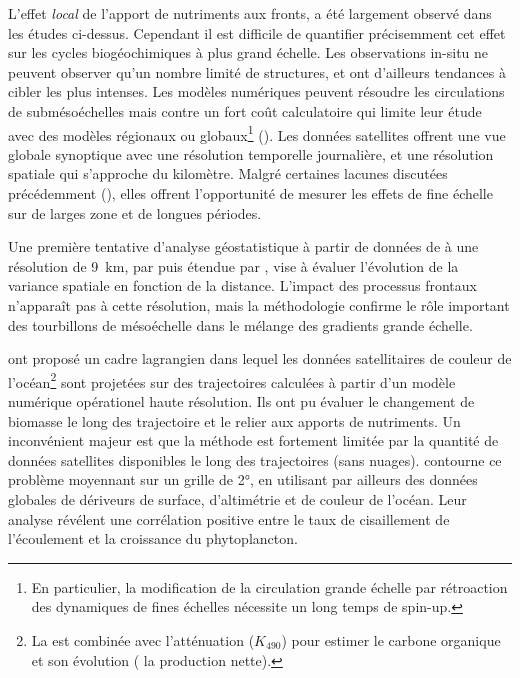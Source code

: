 L'effet \emph{local} de l'apport de nutriments aux fronts, a été largement observé dans les études ci-dessus.
Cependant il est difficile de quantifier précisemment cet effet sur les cycles biogéochimiques à plus grand échelle.
Les observations in-situ ne peuvent observer qu'un nombre limité de structures, et ont d'ailleurs tendances à cibler les plus intenses.
Les modèles numériques peuvent résoudre les circulations de submésoéchelles mais contre un fort coût calculatoire qui limite leur étude avec des modèles régionaux ou globaux\footnote{%
  En particulier, la modification de la circulation grande échelle par rétroaction des dynamiques de fines échelles nécessite un long temps de spin-up.
} (\cite{kessouri_2020,hewitt_2022}).
Les données satellites offrent une vue globale synoptique avec une résolution temporelle journalière, et une résolution spatiale qui s'approche du kilomètre.
Malgré certaines lacunes discutées précédemment (), elles offrent l'opportunité de mesurer les effets de fine échelle sur de larges zone et de longues périodes.

Une première tentative d'analyse géostatistique à partir de données de  à une résolution de \qty{9}{\km}, par \textcite{doney_2003} puis étendue par \textcite{glover_2018}, vise à évaluer l'évolution de la variance spatiale en fonction de la distance.
L'impact des processus frontaux n'apparaît pas à cette résolution, mais la méthodologie confirme le rôle important des tourbillons de mésoéchelle dans le mélange des gradients grande échelle.

\Textcite{jonsson_2011} ont proposé un cadre lagrangien dans lequel les données satellitaires de couleur de l'océan\footnote{%
  La  est combinée avec l'atténuation (\(K_{490}\)) pour estimer le carbone organique et son évolution ( la production nette).
} sont projetées sur des trajectoires calculées à partir d'un modèle numérique opérationel haute résolution.
Ils ont pu évaluer le changement de biomasse le long des trajectoire et le relier aux apports de nutriments.
Un inconvénient majeur est que la méthode est fortement limitée par la quantité de données satellites disponibles le long des trajectoires (sans nuages).
\Textcite{zhang_2019} contourne ce problème moyennant sur un grille de \ang{2}, en utilisant par ailleurs des données globales de dériveurs de surface, d'altimétrie et de couleur de l'océan.
Leur analyse révélent une corrélation positive entre le taux de cisaillement de l'écoulement et la croissance du phytoplancton.

